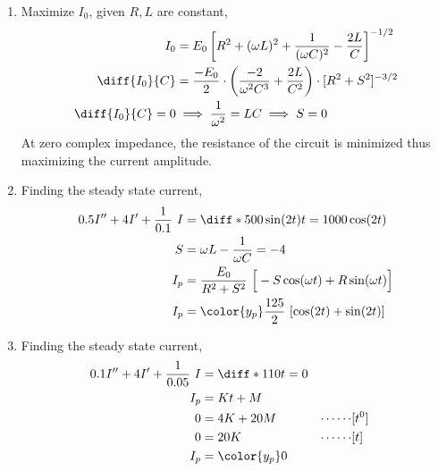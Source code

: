 \begin{enumerate}
    \item Maximize $ I_{0} $, given $ R, L $ are constant,
          \begin{align}
              I_{0}                & = E_{0} \left[ R^{2} + (\omega L)^{2}
                  + \frac{1}{(\omega C)^{2}}
              - \frac{2L}{C} \right]^{-1/2}                                            \\
              \diff {I_{0}}{C}     & = \frac{-E_{0}}{2} \cdot \left( \frac{-2}
              {\omega^{2}C^{3}}
              + \frac{2L}{C^{2}} \right) \cdot [R^{2} + S^{2}]^{-3/2}                  \\
              \diff {I_{0}}{C} = 0 & \implies \frac{1}{\omega^{2}} = LC \implies S = 0
          \end{align}
          At zero complex impedance, the resistance of the circuit is minimized thus
          maximizing the current amplitude.

    \item Finding the steady state current,
          \begin{align}
              0.5I'' + 4I' + \frac{1}{0.1}\ I & = \diff* {500 \sin(2t)}{t}
              = 1000\cos(2t)                                                    \\
              S                               & = \omega L - \frac{1}{\omega C}
              = -4                                                              \\
              I_{p}                           & = \frac{E_{0}}{R^{2} + S^{2}}
              \ \Big[-S\cos(\omega t) + R\sin(\omega t)\Big]                    \\
              I_{p}                           & = {\color{y_p} \frac{125}{2}
              \ [\cos(2t) + \sin(2t)]}                                          \\
          \end{align}

    \item Finding the steady state current,
          \begin{align}
              0.1I'' + 4I' + \frac{1}{0.05}\ I & = \diff* {110}{t} = 0   \\
              I_{p}                            & = Kt + M                \\
              0                                & = 4K + 20M            &
              \cdots\cdots                     & [t^{0}]                 \\
              0                                & = 20K                 &
              \cdots\cdots                     & [t]                     \\
              I_{p}                            & = {\color{y_p} 0}       \\
          \end{align}


\end{enumerate}
